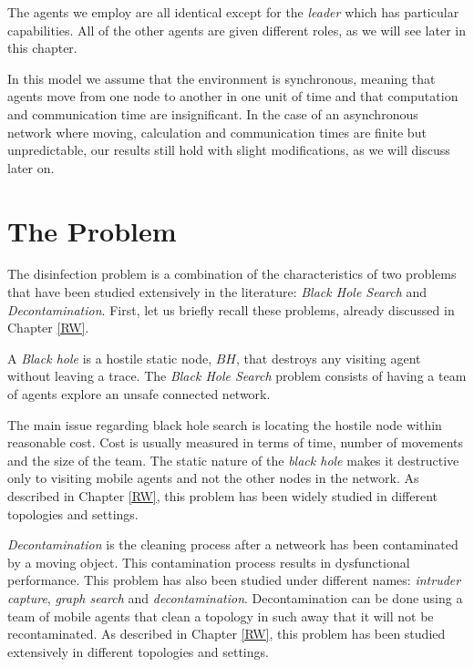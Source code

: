   The agents we employ are all identical except for the {\em leader} which has particular capabilities. All of the other agents are given different roles, as we will see later in this chapter. 

In this model we assume that the environment is synchronous, meaning that agents move from one node to another in one unit of time and that computation and communication time are insignificant. In the case of an asynchronous network where moving, calculation and communication times are finite but unpredictable, our results still hold with slight modifications, as we will discuss later on.



\section{The Problem} 


 The \bv disinfection problem is a combination of the characteristics of two problems that have been studied extensively in the literature: {\it Black Hole Search} and {\it Decontamination}. First, let us briefly recall these problems, already discussed in Chapter \ref{RW}.


   A {\em Black hole} is a  hostile static node, $BH$, that destroys any visiting agent without leaving a trace.
The {\it Black Hole Search} problem consists of having a team of agents explore  an unsafe connected network.

The main issue regarding black hole search  is locating the hostile node within reasonable cost. Cost is usually measured in terms of time, number of movements and the size of the team. The static nature of the {\it black hole} makes it destructive only to visiting mobile agents and not the other nodes in the network. As described in Chapter \ref{RW}, this problem has been widely studied in different topologies and settings.

 
  {\it Decontamination} is the cleaning process after a netweork has been contaminated by a moving object.
This contamination process results in dysfunctional performance. This problem  has also been studied under different names: {\it intruder capture}, {\it graph search} and {\it decontamination}. Decontamination can be done using a team of mobile agents that clean a topology in such away that it will not be recontaminated. As described in Chapter \ref{RW}, this problem has been studied extensively in different topologies and settings.

